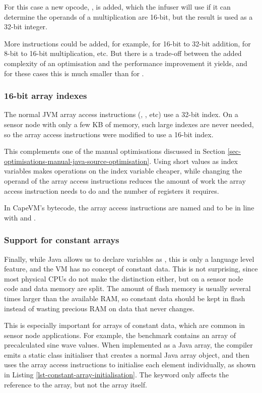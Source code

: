For this case a new opcode, , is added, which the infuser will use if it can determine the operands of a multiplication are 16-bit, but the result is used as a 32-bit integer.

More instructions could be added, for example,  for 16-bit to 32-bit addition,  for 8-bit to 16-bit multiplication, etc. But there is a trade-off between the added complexity of an optimisation and the performance improvement it yields, and for these cases this is much smaller than for .

\subsubsection{16-bit array indexes}
The normal JVM array access instructions (, , etc) use a 32-bit index. On a sensor node with only a few KB of memory, such large indexes are never needed, so the array access instructions were modified to use a 16-bit index. 

This complements one of the manual optimisations discussed in Section \ref{sec-optimisations-manual-java-source-optimisation}. Using short values as index variables makes operations on the index variable cheaper, while changing the operand of the array access instructions reduces the amount of work the array access instruction needs to do and the number of registers it requires.

In CapeVM's bytecode, the array access instructions are named  and  to be in line with  and .

\subsubsection{Support for constant arrays}
\label{sec-opt-constant-arrays}
Finally, while Java allows us to declare variables as , this is only a language level feature, and the VM has no concept of constant data. This is not surprising, since most physical CPUs do not make the distinction either, but on a sensor node code and data memory are split. The amount of flash memory is usually several times larger than the available RAM, so constant data should be kept in flash instead of wasting precious RAM on data that never changes.

This is especially important for arrays of constant data, which are common in sensor node applications. For example, the  benchmark contains an array of precalculated sine wave values. When implemented as a  Java array, the compiler emits a static class initialiser that creates a normal Java array object, and then uses the array access instructions to initialise each element individually, as shown in Listing \ref{lst-constant-array-initialisation}. The  keyword only affects the reference to the  array, but not the array itself.

